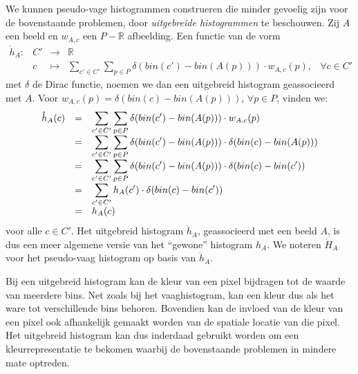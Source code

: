 We kunnen pseudo-vage histogrammen construeren die minder gevoelig zijn voor de bovenstaande problemen,
door \emph{uitgebreide histogrammen} te beschouwen. 
Zij $A$ een beeld en $w_{A,c}$ een $P - \mathbb{R}$ afbeelding. Een functie van de vorm
$$
\begin{array}{rrcll}
\mathring{h}_A: 
 & C' & \to & \mathbb{R} \\
 & c  & \mapsto & \displaystyle\sum_{c' \in C'} \sum_{p \in P} \delta (bin(c')-bin(A(p))) \cdot w_{A,c}(p), & 
 \forall c \in C'
\end{array}
$$ 
met $\delta$ de Dirac functie, noemen we dan een uitgebreid histogram geassocieerd met $A$. 
Voor $w_{A,c}(p)=\delta(bin(c)-bin(A(p)))$, $\forall p \in P$, vinden we:
$$
\begin{array}{r@{\quad=\quad}l}
\mathring{h}_A(c) 
 & \displaystyle \sum_{c' \in C'} \sum_{p \in P} \delta (bin(c')-bin(A(p))) \cdot w_{A,c}(p) \\[2pt]
 & \displaystyle \sum_{c' \in C'} \sum_{p \in P} \delta (bin(c')-bin(A(p))) \cdot \delta (bin(c)-bin(A(p))) \\[2pt]
 & \displaystyle \sum_{c' \in C'} \sum_{p \in P} \delta (bin(c')-bin(A(p))) \cdot \delta (bin(c)-bin(c')) \\[2pt]
 & \displaystyle \sum_{c' \in C'} h_A(c') \cdot \delta (bin(c)-bin(c')) \\[2pt]
 & h_A(c)
\end{array}
$$
voor alle $c \in C'$. Het uitgebreid histogram $\mathring{h}_A$, geassocieerd met een beeld $A$, is 
dus een meer algemene versie van het ``gewone'' histogram $h_A$. We noteren $\mathring{H}_A$ voor het 
pseudo-vaag histogram op basis van $\mathring{h}_A$.

Bij een uitgebreid histogram kan de kleur van een pixel bijdragen tot de waarde van meerdere
bins. Net zoals bij het vaaghistogram, kan een kleur dus als het ware tot verschillende 
bins behoren. Bovendien kan de invloed van de kleur van een pixel ook afhankelijk gemaakt worden
van de spatiale locatie van die pixel. Het uitgebreid histogram kan dus inderdaad gebruikt
worden om een kleurrepresentatie te bekomen waarbij de bovenstaande problemen in mindere mate
optreden.


